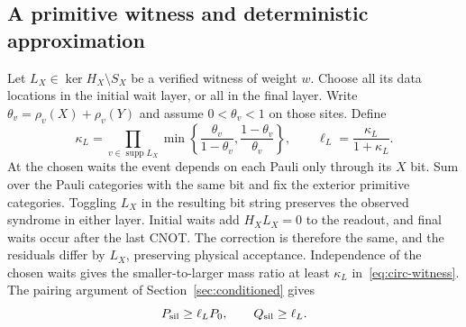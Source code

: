 \documentclass[10pt,twocolumn]{article}
\theoremstyle{definition}
\DeclareMathOperator{\supp}{supp}
\begin{document}
\subsection{A primitive witness and deterministic approximation}
Let $L_X\in\ker H_X\setminus S_X$ be a verified witness of weight $w$.
Choose all its data locations in the initial wait layer, or all in the
final layer. Write $\theta_v=\rho_v(X)+\rho_v(Y)$ and assume
$0<\theta_v<1$ on those sites. Define
\begin{equation}\label{eq:circ-witness}
 \kappa_L=\prod_{v\in\supp L_X}
 \min\left\{\frac{\theta_v}{1-\theta_v},
                  \frac{1-\theta_v}{\theta_v}\right\},\qquad
 \ell_L=\frac{\kappa_L}{1+\kappa_L}.
\end{equation}
At the chosen waits the event depends on each Pauli only through
its $X$ bit. Sum over the Pauli categories with the same bit and
fix the exterior primitive categories. Toggling $L_X$ in the resulting
bit string preserves the observed syndrome in either layer. Initial
waits add $H_XL_X=0$ to the readout, and final waits occur after
the last CNOT. The correction is therefore the same, and the residuals
differ by $L_X$, preserving physical acceptance. Independence of the
chosen waits gives the smaller-to-larger mass ratio at least $\kappa_L$
in~\eqref{eq:circ-witness}. The pairing argument of
Section~\ref{sec:conditioned} gives
\begin{equation}\label{eq:circ-witness-bound}
 P_{\rm sil}\ge\ell_L P_0,\qquad Q_{\rm sil}\ge\ell_L.
\end{equation}
\end{document}
